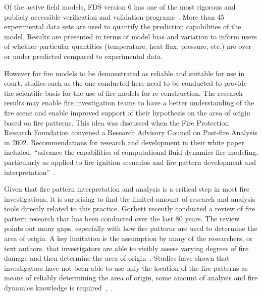\documentclass[twoside]{uocthesis}
\begin{document}
Of the active field models, FDS version 6 has one of the most rigorous and publicly accessible verification and validation programs~\cite{McGrattan:2014}. More than 45 experimental data sets are used to quantify the prediction capabilities of the model.  Results are presented in terms of model bias and variation to inform users of whether particular quantities (temperature, heat flux, pressure, etc.) are over or under predicted compared to experimental data.

However for fire models to be demonstrated as reliable and suitable for use in court, studies such as the one conducted here need to be conducted to provide the scientific basis for the use of fire models for re-construction.  The research results may enable fire investigation teams to have a better understanding of the fire scene and enable improved support of their hypothesis on the area of origin based on fire patterns.  This idea was discussed when the Fire Protection Research Foundation convened a Research Advisory Council on Post-fire Analysis in 2002.  Recommendations for research and development in their white paper included, ``advance the capabilities of computational fluid dynamics fire modeling, particularly as applied to fire ignition scenarios and fire pattern development and interpretation''~\cite{RAC:2002}.

Given that fire pattern interpretation and analysis is a critical step in most fire investigations, it is surprising to find the limited amount of research and analysis tools directly related to this practice.  Gorbett recently conducted a review of fire pattern research that has been conducted over the last 80 years. The review points out many gaps, especially with how fire patterns are used to determine the area of origin.  A key limitation is the assumption by many of the researchers, or text authors, that investigators are able to visibly assess varying degrees of fire damage and then determine the area of origin~\cite{Gorbett_2015}. Studies have shown that investigators have not been able to use only the location of the fire patterns as means of reliably determining the area of origin, some amount of analysis and fire dynamics knowledge is required~\cite{Carmen_2008},~\cite{Tinsley_2013}.      
\end{document}

